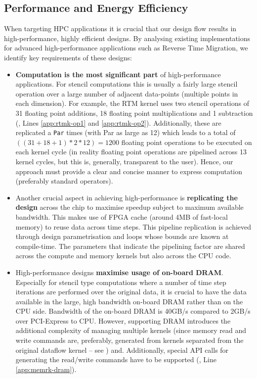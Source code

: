 \subsection{Performance and Energy Efficiency}
When targeting HPC applications it is crucial that our design flow
results in high-performance, highly efficient designs. By analysing
existing implementations for advanced high-performance applications
such as Reverse Time Migration, we identify key requirements of these
designs:

\begin{itemize}

\item \textbf{Computation is the most significant part} of
  high-performance applications. For stencil computations this is
  usually a fairly large stencil operation over a large number of
  adjacent data-points (multiple points in each dimension). For
  example, the RTM kernel uses two stencil operations of 31 floating
  point additions, 18 floating point multiplications and 1
  subtraction (, Lines \ref{app:rtmk-op1} and
  \ref{app:rtmk-op2}).  Additionally, these are replicated a
  \texttt{Par} times (with Par as large as 12) which leads to a total
  of $((31 + 18 + 1) * 2 * 12) = 1200 $ floating point operations to
  be executed on each kernel cycle (in reality floating point
  operations are pipelined across 13 kernel cycles, but this is,
  generally, transparent to the user). Hence, our approach must
  provide a clear and concise manner to express computation
  (preferably standard operators).

\item Another crucial aspect in achieving high-performance is
  \textbf{replicating the design} across the chip to maximise speedup
  subject to maximum available bandwidth. This makes use of FPGA cache
  (around 4MB of fast-local memory) to reuse data across time
  steps. This pipeline replication is achieved through design
  parametrisation and loops whose bounds are known at
  compile-time. The parameters that indicate the pipelining factor are
  shared across the compute and memory kernels but also across the CPU
  code.

\item High-performance designs \textbf{maximise usage of on-board
    DRAM}. Especially for stencil type computations where a number of
  time step iterations are performed over the original data, it is
  crucial to have the data available in the large, high bandwidth
  on-board DRAM rather than on the CPU side. Bandwidth of the on-board
  DRAM is 40GB/s compared to 2GB/s over PCI-Express to CPU. However,
  supporting DRAM introduces the additional complexity of managing
  multiple kernels (since memory read and write commands are,
  preferably, generated from kernels separated from the original
  dataflow kernel -- see )
  and. Additionally, special API calls for generating the read/write
  commands have to be supported (, Line
  \ref{app:memrk-dram}).


\end{itemize}
